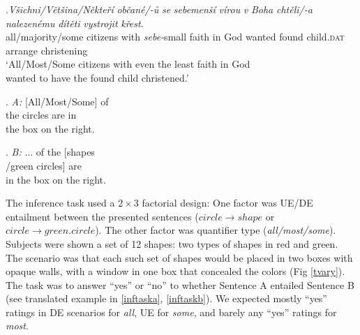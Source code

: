 \documentclass[12pt,a4paper]{article}
\begin{document}
\begin{minipage}{0.67\textwidth}

\exg.\small\textit{Všichni/Většina/Někteří} \small\textit{občané/-ů} \small\textit{se} \small\textit{sebemenší} \small\textit{vírou} \small\textit{v} \small\textit{Boha} \small\textit{chtěli/-a} \small\textit{nalezenému} \small\textit{dítěti} \small\textit{vystrojit} \small\textit{křest}.\label{dite}\\
\small all/majority/some \small citizens \small with \small \textit{sebe-}small \small faith \small in \small God \small wanted \small found \small child.\textsc{dat} \small arrange \small christening\\
\small ‘All/Most/Some citizens with even the least faith in God\\
wanted to have the found child christened.’

\end{minipage}
\hfill
\begin{minipage}{0.35\textwidth}

\ex.\label{inftaska}\small
\hspace{-6mm}\textit{A:} [All/Most/Some] of\\
the circles are in\\
the box on the right.\hspace{+5mm}

\ex.\label{inftaskb}\small
\hspace{-6mm}\textit{B:} ... of the [shapes\\
/green circles] are\\
in the box on the right.

\end{minipage}
\vspace{+0.5mm}

\noindent The inference task used a $2\times3$ factorial design: One factor was UE/DE entailment between the presented sentences ($circle\rightarrow shape$ or $circle\rightarrow green.circle$). The other factor was quantifier type (\textit{all/most/some}). Subjects were shown a set of 12 shapes: two types of shapes in red and green. The scenario was that each such set of shapes would be placed in two boxes with opaque walls, with a window in one box that concealed the colors (Fig \ref{tvary}). The task was to answer “yes” or “no” to whether Sentence A entailed Sentence B (see translated example in \ref{inftaska}, \ref{inftaskb}). We expected mostly “yes” ratings in DE scenarios for \textit{all}, UE for \textit{some}, and barely any “yes” ratings for \textit{most}.\vspace{-2mm}
\end{document}
